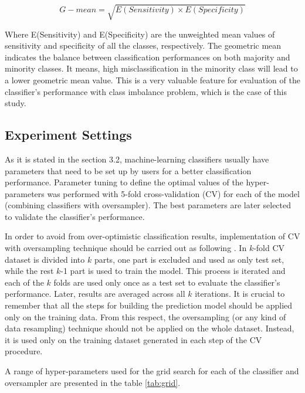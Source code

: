 \documentclass[parskip=full]{scrartcl}
\begin{document}
\[
G{-}mean = \sqrt{E(Sensitivity) \times E(Specificity)}
\]

Where E(Sensitivity) and E(Specificity) are the unweighted mean values of
sensitivity and specificity of all the classes, respectively. The geometric 
mean indicates the balance between classification performances on both majority 
and minority classes. It means, high misclassification in the minority class 
will lead to a lower geometric mean value. This is a very valuable feature for 
evaluation of the classifier's performance with class imbalance problem, which 
is the case of this study. 


\subsection{Experiment Settings}

As it is stated in the section 3.2, machine-learning classifiers usually have
parameters that need to be set up by users for a better classification
performance. Parameter tuning to define the optimal values of the
hyper-parameters was performed with 5-fold cross-validation (CV) for each of
the model (combining classifiers with oversampler). The best parameters are
later selected to validate the classifier's performance.

In order to avoid from over-optimistic classification results, implementation
of CV with oversampling technique should be carried out as following
\cite{Lusa2015}. In $k$-fold CV dataset is divided into $k$ parts, one part is
excluded and used as only test set, while the rest $k$-1 part is used to train
the model. This process is iterated and each of the $k$ folds are used only
once as a test set to evaluate the classifier's performance. Later, results are
averaged across all $k$ iterations. It is crucial to remember that
all the steps for building the prediction model should be applied only on the
training data. From this respect, the oversampling (or any kind of data
resampling) technique should not be applied on the whole dataset. Instead, it
is used only on the training dataset generated in each step of the CV
procedure.

A range of hyper-parameters used for the grid search for each of the
classifier and oversampler are presented in the table \ref{tab:grid}.
\end{document}
